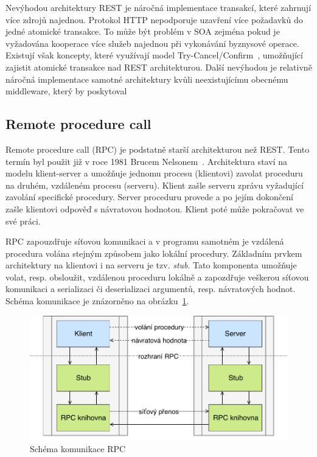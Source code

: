 Nevýhodou architektury \gls{REST} je náročná implementace transakcí, které zahrnují více
zdrojů najednou. Protokol \gls{HTTP} nepodporuje uzavření více požadavků do jedné atomické
transakce. To může být problém v \gls{SOA} zejména pokud je vyžadována kooperace více služeb
najednou při vykonávání byznysové operace. Existují však koncepty, které využívají model
Try-Cancel/Confirm~\cite{pardon2011towards}, umožňující zajistit atomické transakce nad
\gls{REST} architekturou. Další nevýhodou je relativně náročná implementace samotné architektury
kvůli neexistujícímu obecnému middleware, který by poskytoval

\subsection{Remote procedure call}\label{sec:rpc}

Remote procedure call (\gls{RPC}) je podstatně starší architekturou než \gls{REST}.
Tento termín byl použit již v roce 1981 Brucem Nelsonem~\cite{nelson1981remote}.
Architektura staví na modelu klient-server a umožňuje jednomu procesu (klientovi)
zavolat proceduru na druhém, vzdáleném procesu (serveru).
Klient zašle serveru zprávu vyžadující zavolání specifické procedury. Server
proceduru provede a po jejím dokončení zašle klientovi odpověď s návratovou hodnotou.
Klient poté může pokračovat ve své práci.

\gls{RPC} zapouzdřuje síťovou komunikaci a v programu samotném
je vzdálená procedura volána stejným způsobem jako lokální procedury. Základním
prvkem architektury na klientovi i na serveru je tzv. \textit{stub}. Tato komponenta
umožňuje volat, resp. obsloužit, vzdálenou proceduru lokálně a zapozdřuje veškerou
síťovou komunikaci a serializaci či deserializaci argumentů, resp. návratových hodnot.
Schéma komunikace je znázorněno na obrázku~\ref{fig:rpc}.

\begin{figure}[t]
    \centering
    \includegraphics[keepaspectratio=true, width=0.7\linewidth]{figures/rpc.pdf}
    \caption{Schéma komunikace \gls{RPC}}
    \label{fig:rpc}
\end{figure}

